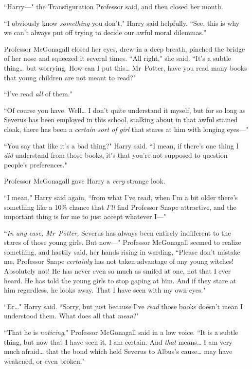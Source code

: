 ``Harry—" the Transfiguration Professor said, and then closed her mouth.

``I obviously know \emph{something} you don't," Harry said helpfully. ``See, this is why we can't always put off trying to decide our awful moral dilemmas."

Professor McGonagall closed her eyes, drew in a deep breath, pinched the bridge of her nose and squeezed it several times. ``All right," she said. ``It's a subtle thing{\ldots} but worrying. How can I put this{\ldots} Mr~Potter, have you read many books that young children are not meant to read?"

``I've read \emph{all} of them."

``Of course you have. Well{\ldots} I don't quite understand it myself, but for so long as Severus has been employed in this school, stalking about in that awful stained cloak, there has been a \emph{certain sort of girl} that stares at him with longing eyes—"

``You say that like it's a bad thing?" Harry said. ``I mean, if there's one thing I \emph{did} understand from those books, it's that you're not supposed to question people's preferences."

Professor McGonagall gave Harry a \emph{very} strange look.

``I mean," Harry said again, ``from what I've read, when I'm a bit older there's something like a 10\% chance that \emph{I'll} find Professor Snape attractive, and the important thing is for me to just accept whatever I—"

``\emph{In any case, Mr~Potter,} Severus has always been entirely indifferent to the stares of those young girls. But now—" Professor McGonagall seemed to realize something, and hastily said, her hands rising in warding, ``Please don't mistake me, Professor Snape \emph{certainly} has not taken advantage of any young witches! Absolutely not! He has never even so much as smiled at one, not that I ever heard. He has told the young girls to stop gaping at him. And if they stare at him regardless, he looks away. That I have seen with my own eyes."

``Er{\ldots}" Harry said. ``Sorry, but just because I've \emph{read} those books doesn't mean I understood them. What does all that \emph{mean}?"

``That he is \emph{noticing}," Professor McGonagall said in a low voice. ``It is a subtle thing, but now that I have seen it, I am certain. And \emph{that} means{\ldots} I am very much afraid{\ldots} that the bond which held Severus to Albus's cause{\ldots} may have weakened, or even broken."

